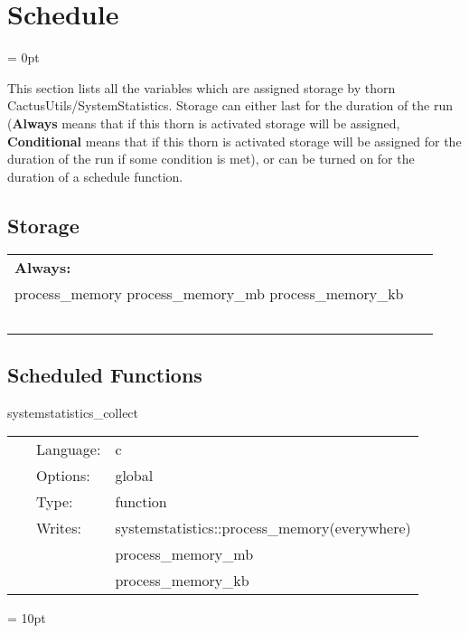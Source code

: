 \documentclass{article}
\begin{document}
\section{Schedule} 


\parskip = 0pt


\noindent This section lists all the variables which are assigned storage by thorn CactusUtils/SystemStatistics.  Storage can either last for the duration of the run ({\bf Always} means that if this thorn is activated storage will be assigned, {\bf Conditional} means that if this thorn is activated storage will be assigned for the duration of the run if some condition is met), or can be turned on for the duration of a schedule function.


\subsection*{Storage}

\hspace{5mm}

 \begin{tabular*}{160mm}{ll} 

{\bf Always:}&  ~ \\ 
 process\_memory process\_memory\_mb process\_memory\_kb & ~\\ 
~ & ~\\ 
\end{tabular*} 


\subsection*{Scheduled Functions}
\vspace{5mm}


\hspace{5mm} systemstatistics\_collect 

\hspace{5mm}{\it collect system statistics } 


\hspace{5mm}

 \begin{tabular*}{160mm}{cll} 
~ & Language:  & c \\ 
~ & Options:  & global \\ 
~ & Type:  & function \\ 
~ & Writes:  & systemstatistics::process\_memory(everywhere) \\ 
~& ~ &process\_memory\_mb\\ 
~& ~ &process\_memory\_kb\\ 
\end{tabular*} 



\vspace{5mm}\parskip = 10pt 
\end{document}
